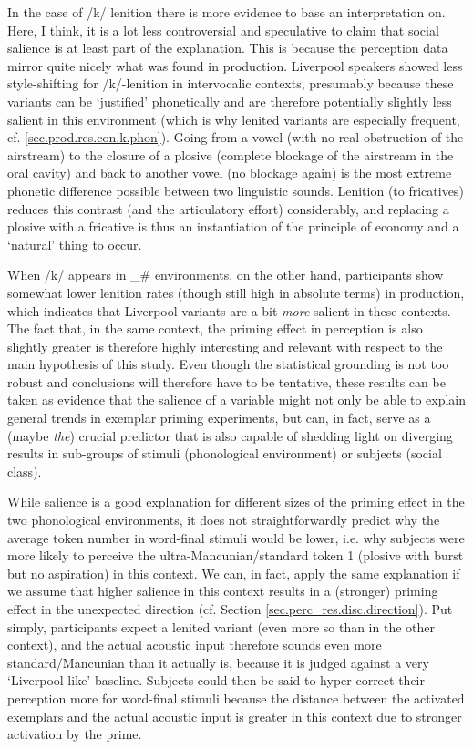 In the case of /k/ lenition there is more evidence to base an interpretation on.
Here, I think, it is a lot less controversial and speculative to claim that social salience is at least part of the explanation.
This is because the perception data mirror quite nicely what was found in production.
Liverpool speakers showed less style-shifting for /k/-lenition in intervocalic contexts, presumably because these variants can be `justified' phonetically and are therefore potentially slightly less salient in this environment (which is why lenited variants are especially frequent, cf. \ref{sec.prod.res.con.k.phon}).
Going from a vowel (with no real obstruction of the airstream) to the closure of a plosive (complete blockage of the airstream in the oral cavity) and back to another vowel (no blockage again) is the most extreme phonetic difference possible between two linguistic sounds.
Lenition (to fricatives) reduces this contrast (and the articulatory effort) considerably, and replacing a plosive with a fricative is thus an instantiation of the principle of economy and a `natural' thing to occur.

When /k/ appears in \_\# environments, on the other hand, participants show somewhat lower lenition rates (though still high in absolute terms) in production, which indicates that Liverpool variants are a bit \emph{more} salient in these contexts.
The fact that, in the same context, the priming effect in perception is also slightly greater is therefore highly interesting and relevant with respect to the main hypothesis of this study.
Even though the statistical grounding is not too robust and conclusions will therefore have to be tentative, these results can be taken as evidence that the salience of a variable might not only be able to explain general trends in exemplar priming experiments, but can, in fact, serve as a (maybe \emph{the}) crucial predictor that is also capable of shedding light on diverging results in sub-groups of stimuli (phonological environment) or subjects (social class).

While salience is a good explanation for different sizes of the priming effect in the two phonological environments, it does not straightforwardly predict why the average token number in word-final stimuli would be lower, i.e. why subjects were more likely to perceive the ultra-Mancunian/standard token 1 (plosive with burst but no aspiration) in this context.
We can, in fact, apply the same explanation if we assume that higher salience in this context results in a (stronger) priming effect in the unexpected direction (cf. Section \ref{sec.perc_res.disc.direction}).
Put simply, participants expect a lenited variant (even more so than in the other context), and the actual acoustic input therefore sounds even more standard/Mancunian than it actually is, because it is judged against a very `Liverpool-like' baseline.
Subjects could then be said to hyper-correct their perception more for word-final stimuli because the distance between the activated exemplars and the actual acoustic input is greater in this context due to stronger activation by the prime.

